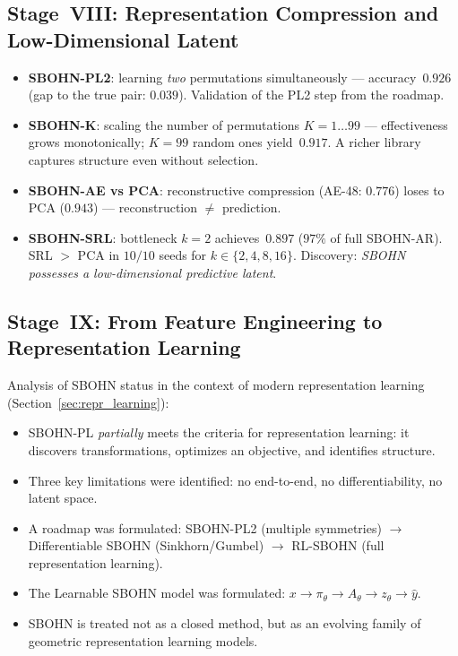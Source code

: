 \documentclass[11pt,a4paper]{report}
\begin{document}
\subsection{Stage~VIII: Representation Compression and Low-Dimensional Latent}

\begin{itemize}
\item \textbf{SBOHN-PL2}: learning \emph{two} permutations simultaneously --- accuracy~$0.926$ (gap to the true pair: $0.039$). Validation of the PL2 step from the roadmap.
\item \textbf{SBOHN-K}: scaling the number of permutations $K=1\ldots 99$ --- effectiveness grows monotonically; $K=99$ random ones yield~$0.917$. A richer library captures structure even without selection.
\item \textbf{SBOHN-AE vs PCA}: reconstructive compression (AE-48: $0.776$) loses to PCA ($0.943$) --- reconstruction $\neq$ prediction.
\item \textbf{SBOHN-SRL}: bottleneck $k=2$ achieves~$0.897$ ($97\%$ of full SBOHN-AR). SRL $>$ PCA in $10/10$ seeds for $k\in\{2,4,8,16\}$. Discovery: \emph{SBOHN possesses a low-dimensional predictive latent}.
\end{itemize}

\subsection{Stage~IX: From Feature Engineering to Representation Learning}

Analysis of SBOHN status in the context of modern representation learning (Section~\ref{sec:repr_learning}):
\begin{itemize}
\item SBOHN-PL \emph{partially} meets the criteria for representation learning: it discovers transformations, optimizes an objective, and identifies structure.
\item Three key limitations were identified: no end-to-end, no differentiability, no latent space.
\item A roadmap was formulated: SBOHN-PL2 (multiple symmetries) $\to$ Differentiable SBOHN (Sinkhorn/Gumbel) $\to$ RL-SBOHN (full representation learning).
\item The Learnable SBOHN model was formulated: $x\to\pi_\theta\to A_\theta\to z_\theta\to\hat{y}$.
\item SBOHN is treated not as a closed method, but as an evolving family of geometric representation learning models.
\end{itemize}
\end{document}

